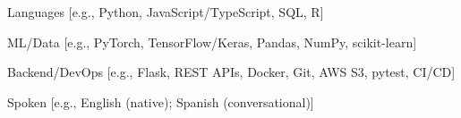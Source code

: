 

\begin{cvskills}

  \cvskill
    {Languages} %
    {[e.g., Python, JavaScript/TypeScript, SQL, R]} %

  \cvskill
    {ML/Data} %
    {[e.g., PyTorch, TensorFlow/Keras, Pandas, NumPy, scikit-learn]} %

  \cvskill
    {Backend/DevOps} %
    {[e.g., Flask, REST APIs, Docker, Git, AWS S3, pytest, CI/CD]} %

  \cvskill
    {Spoken} %
    {[e.g., English (native); Spanish (conversational)]} %

\end{cvskills}

